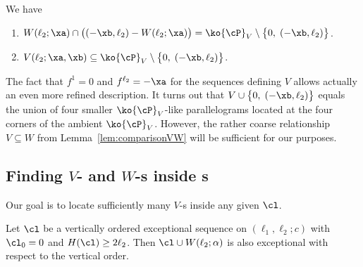 \begin{lemma}
\label{lem:comparisonPW}
We have
\begin{enumerate}
\item[(i)] $W(\ell_2;\xa)\cap\big((-\xb,\ell_2) - W(\ell_2;\xa)\big)
= \ko{\cP}_V\setminus \big\{0,\;(-\xb,\ell_2)\big\}$.
\vspace{1ex}
\item[(ii)] $V(\ell_2;\xa,\xb)\subseteq \ko{\cP}_V\setminus
\big\{0,\;(-\xb,\ell_2)\big\}$.
\end{enumerate}
\end{lemma}

\begin{rema}
\label{rem:shapeV}
The fact that $f^1=0$ and $f^{\ell_2}=-\xa$ for the sequences 
defining $V$ allows actually an even more
refined description. It turns out that 
$V\cup\big\{0,\;(-\xb,\ell_2)\big\}$ equals the union 
of four smaller $\ko{\cP}_V$-like parallelograms
located at the four corners of the ambient $\ko{\cP}_V$. However, 
the rather coarse relationship 
$V\subseteq W$ from Lemma~\ref{lem:comparisonVW} will be
sufficient for our purposes.
\end{rema}

\subsection{Finding \texorpdfstring{$V$}{V}- and \texorpdfstring{$W$-{\wbox}}{W}s inside \texorpdfstring{\mes s}{s}}
\label{subsec:BoxesAndMES}
Our goal is to {locate} sufficiently 
many $V$-{\wbox}s inside any given {\mes} $\cl$.

\begin{lemma}
\label{lem:InsertWBox}
Let $\cl$ be a vertically ordered exceptional sequence on 
$(\ell_1,\ell_2;c)$ with $\cl_0=0$ and $H(\cl)\geq2\ell_2$. 
Then $\cl\cup W(\ell_2;\alpha)$ is also exceptional with 
respect to the vertical order.
\end{lemma}

